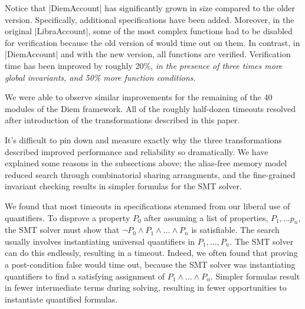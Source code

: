 \noindent Notice that |DiemAccount| has significantly grown in size compared to
the older version. Specifically, additional specifications have been
added. Moreover, in the original |LibraAccount|, some of the most complex
functions had to be disabled for verification because the old version of \MVP
would time out on them. In contrast, in |DiemAccount| and with the new version,
all functions are verified. Verification time has been improved by roughly 20\%,
\emph{in the presence of three times more global invariants, and 50\% more function
conditions}.

We were able to observe similar improvements for the remaining of the 40 modules
of the Diem framework. All of the roughly half-dozen timeouts resolved after
introduction of the transformations described in this paper.





It's difficult to pin down and measure exactly why the three transformations
described improved performance and reliability so dramatically.  We have
explained some reasons in the subsections above: the alias-free memory model
reduced search through combinatorial sharing arrangments, and the fine-grained
invariant checking results in simpler formulas for the SMT solver.

We found that most timeouts in specifications stemmed from our liberal use of
quantifiers.  To disprove a property $P_0$ after assuming a list of properties,
$P_1, \ldots p_n$, the SMT solver must show that
$\neg P_0 \wedge P_1 \wedge \ldots \wedge P_n$ is satisfiable.  The search
usually involves instantiating universal quantifiers in $P_1, \ldots, P_n$.  The
SMT solver can do this endlessly, resulting in a timeout. Indeed, we often found
that proving a post-condition false would time out, because the SMT solver was
instantiating quantifiers to find a satisfying assignment of
$P_1 \wedge \ldots \wedge P_n$.  Simpler formulas result in fewer intermediate
terms during solving, resulting in fewer opportunities to instantiate quantified
formulas.

